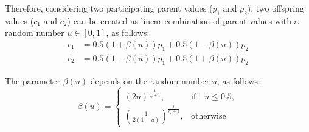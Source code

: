 Therefore, considering two participating parent values ($p_1$ and $p_2$), two offspring values ($c_1$ and $c_2$) can be created as linear combination of parent values with a random number $u \in [0, 1]$, as follows:
\begin{equation} 
\begin{split}
c_1 &= 0.5(1 + \beta(u))p_1 + 0.5(1 - \beta(u)) p_2 \\
c_2 &= 0.5(1 - \beta(u))p_1 + 0.5(1 + \beta(u)) p_2
\end{split}
\end{equation}

The parameter $\beta(u)$ depends on the random number $u$, as follows:
\begin{equation}
    \beta(u)= 
\begin{cases}
     (2u)^{\frac{1}{\eta_c+1}},& \text{if} \quad u \leq 0.5,\\
     	(\frac{1}{2(1-u)})^{\frac{1}{\eta_c +1}} ,& \text{otherwise}
\end{cases}
\end{equation}

